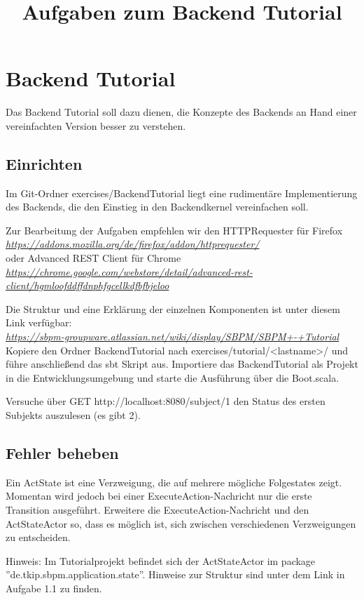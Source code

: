 \documentclass[11pt]{tudexercise}
\title{Aufgaben zum Backend Tutorial}
\newcommand{\link}[1]{\\ \textcolor{blue}{\textit{\url{#1}}}}
\begin{document}
  \maketitle

\section{Backend Tutorial}
  Das Backend Tutorial soll dazu dienen, die Konzepte des Backends an Hand einer vereinfachten
  Version besser zu verstehen.

  \subsection{Einrichten}
    Im Git-Ordner exercises/BackendTutorial liegt eine rudimentäre Implementierung des Backends,
    die den Einstieg in den Backendkernel vereinfachen soll.

    Zur Bearbeitung der Aufgaben empfehlen wir den HTTPRequester für Firefox
    \link{https://addons.mozilla.org/de/firefox/addon/httprequester/}\\
    oder Advanced REST Client für Chrome
    \link{https://chrome.google.com/webstore/detail/advanced-rest-client/hgmloofddffdnphfgcellkdfbfbjeloo}

    Die Struktur und eine Erklärung der einzelnen Komponenten ist unter diesem Link verfügbar:
    \link{https://sbpm-groupware.atlassian.net/wiki/display/SBPM/SBPM+-+Tutorial}\\
    Kopiere den Ordner BackendTutorial nach exercises/tutorial/<lastname>/ und führe anschließend das sbt Skript aus.
    Importiere das BackendTutorial als Projekt in die Entwicklungsumgebung und starte die Ausführung
    über die Boot.scala.

    Versuche über GET http://localhost:8080/subject/1 den Status des ersten Subjekts auszulesen (es gibt 2).

  \subsection{Fehler beheben}
    Ein ActState ist eine Verzweigung, die auf mehrere mögliche Folgestates zeigt. Momentan wird jedoch bei
    einer ExecuteAction-Nachricht nur die erste Transition ausgeführt. Erweitere die ExecuteAction-Nachricht
    und den ActStateActor so, dass es möglich ist, sich zwischen verschiedenen Verzweigungen zu entscheiden.

Hinweis: Im Tutorialprojekt befindet sich der ActStateActor im package ''de.tkip.sbpm.application.state''. Hinweise zur Struktur sind unter dem Link in Aufgabe 1.1 zu finden.
\end{document}
